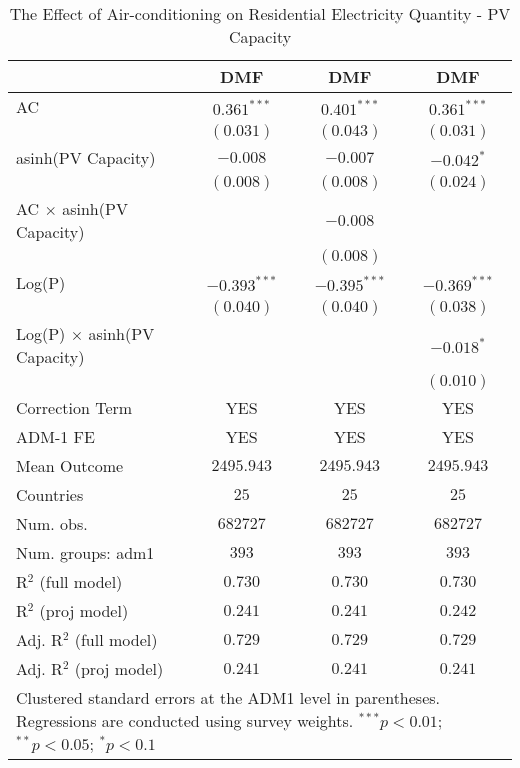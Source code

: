 
\begin{table}[htbp]
\caption{The Effect of Air-conditioning on Residential Electricity Quantity - PV Capacity}
\begin{center}
\begin{tabular}{l c c c}
\hline
 & DMF & DMF & DMF \\
\hline
AC                                 & $0.361^{***}$  & $0.401^{***}$  & $0.361^{***}$  \\
                                   & $(0.031)$      & $(0.043)$      & $(0.031)$      \\
asinh(PV Capacity)                 & $-0.008$       & $-0.007$       & $-0.042^{*}$   \\
                                   & $(0.008)$      & $(0.008)$      & $(0.024)$      \\
AC $\times$ asinh(PV Capacity)     &                & $-0.008$       &                \\
                                   &                & $(0.008)$      &                \\
Log(P)                             & $-0.393^{***}$ & $-0.395^{***}$ & $-0.369^{***}$ \\
                                   & $(0.040)$      & $(0.040)$      & $(0.038)$      \\
Log(P) $\times$ asinh(PV Capacity) &                &                & $-0.018^{*}$   \\
                                   &                &                & $(0.010)$      \\
\hline
Correction Term                    & YES            & YES            & YES            \\
ADM-1 FE                           & YES            & YES            & YES            \\
Mean Outcome                       & $2495.943$     & $2495.943$     & $2495.943$     \\
Countries                          & $25$           & $25$           & $25$           \\
Num. obs.                          & $682727$       & $682727$       & $682727$       \\
Num. groups: adm1                  & $393$          & $393$          & $393$          \\
R$^2$ (full model)                 & $0.730$        & $0.730$        & $0.730$        \\
R$^2$ (proj model)                 & $0.241$        & $0.241$        & $0.242$        \\
Adj. R$^2$ (full model)            & $0.729$        & $0.729$        & $0.729$        \\
Adj. R$^2$ (proj model)            & $0.241$        & $0.241$        & $0.241$        \\
\hline
\multicolumn{4}{l}{\scriptsize{Clustered standard errors at the ADM1 level in parentheses. Regressions are conducted using survey weights. $^{***}p<0.01$; $^{**}p<0.05$; $^{*}p<0.1$}}
\end{tabular}
\label{main: tableA7}
\end{center}
\end{table}
